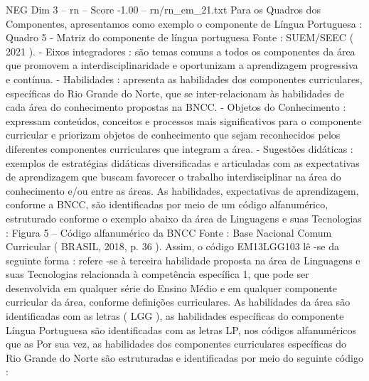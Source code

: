 \begin{textsample}{NEG Dim 3 – rn – Score -1.00 – rn/rn\_em\_21.txt}
Para os Quadros dos Componentes, apresentamos como exemplo o componente de Língua Portuguesa : Quadro 5 - Matriz do componente de língua portuguesa Fonte : SUEM/SEEC ( 2021 ). - Eixos integradores : são temas comuns a todos os componentes da área que promovem a interdisciplinaridade e oportunizam a aprendizagem progressiva e contínua. - Habilidades : apresenta as habilidades dos componentes curriculares, específicas do Rio Grande do Norte, que se inter-relacionam às habilidades de cada área do conhecimento propostas na BNCC. - Objetos do Conhecimento : expressam conteúdos, conceitos e processos mais significativos para o componente curricular e priorizam objetos de conhecimento que sejam reconhecidos pelos diferentes componentes curriculares que integram a área. - Sugestões didáticas : exemplos de estratégias didáticas diversificadas e articuladas com as expectativas de aprendizagem que buscam favorecer o trabalho interdisciplinar na área do conhecimento e/ou entre as áreas.
As habilidades, expectativas de aprendizagem, conforme a BNCC, são identificadas por meio de um código alfanumérico, estruturado conforme o exemplo abaixo da área de Linguagens e suas Tecnologias : Figura 5 – Código alfanumérico da BNCC Fonte : Base Nacional Comum Curricular ( BRASIL, 2018, p. 36 ).
Assim, o código EM13LGG103 lê -se da seguinte forma : refere -se à terceira habilidade proposta na área de Linguagens e suas Tecnologias relacionada à competência específica 1, que pode ser desenvolvida em qualquer série do Ensino Médio e em qualquer componente curricular da área, conforme definições curriculares.
As habilidades da área são identificadas com as letras ( LGG ), as habilidades específicas do componente Língua Portuguesa são identificadas com as letras LP, nos códigos alfanuméricos que as Por sua vez, as habilidades dos componentes curriculares específicas do Rio Grande do Norte são estruturadas e identificadas por meio do seguinte código :

\end{textsample}
